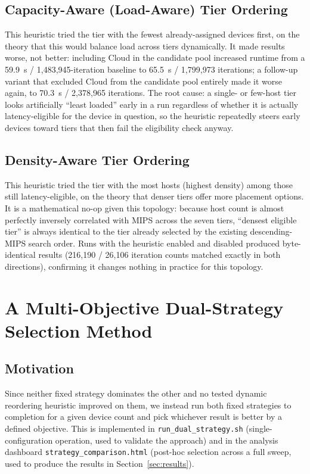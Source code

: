 \documentclass[10pt,conference]{IEEEtran}
\begin{document}
\subsection{Capacity-Aware (Load-Aware) Tier Ordering}\label{sub:capacity}
This heuristic tried the tier with the fewest already-assigned devices first, on the theory that this would balance load across tiers dynamically. It made results worse, not better: including Cloud in the candidate pool increased runtime from a 59.9~s / 1{,}483{,}945-iteration baseline to 65.5~s / 1{,}799{,}973 iterations; a follow-up variant that excluded Cloud from the candidate pool entirely made it worse again, to 70.3~s / 2{,}378{,}965 iterations. The root cause: a single- or few-host tier looks artificially ``least loaded'' early in a run regardless of whether it is actually latency-eligible for the device in question, so the heuristic repeatedly steers early devices toward tiers that then fail the eligibility check anyway.

\subsection{Density-Aware Tier Ordering}\label{sub:density}
This heuristic tried the tier with the most hosts (highest density) among those still latency-eligible, on the theory that denser tiers offer more placement options. It is a mathematical no-op given this topology: because host count is almost perfectly inversely correlated with MIPS across the seven tiers, ``densest eligible tier'' is always identical to the tier already selected by the existing descending-MIPS search order. Runs with the heuristic enabled and disabled produced byte-identical results (216{,}190 / 26{,}106 iteration counts matched exactly in both directions), confirming it changes nothing in practice for this topology.

\section{A Multi-Objective Dual-Strategy Selection Method}\label{sec:method}
\subsection{Motivation}\label{sub:motivation}
Since neither fixed strategy dominates the other and no tested dynamic reordering heuristic improved on them, we instead run both fixed strategies to completion for a given device count and pick whichever result is better by a defined objective. This is implemented in \texttt{run\_dual\_strategy.sh} (single-configuration operation, used to validate the approach) and in the analysis dashboard \texttt{strategy\_comparison.html} (post-hoc selection across a full sweep, used to produce the results in Section~\ref{sec:results}).
\end{document}
